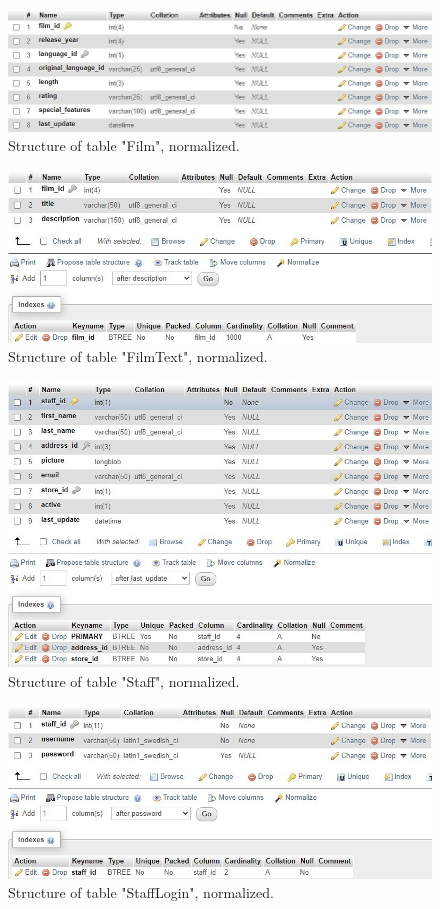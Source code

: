 \documentclass{article}
\begin{document}
		\begin{figure}[H]
			\includegraphics[width=\textwidth]{table_film_nstruct}
			\caption{Structure of table "Film", normalized.}
		\end{figure}
		\begin{figure}[H]
			\includegraphics[width=\textwidth]{table_filmtext_nstruct}
			\caption{Structure of table "Film\textunderscore Text", normalized.}
		\end{figure}
		\begin{figure}[H]
			\includegraphics[width=\textwidth]{table_staff_nstruct}
			\caption{Structure of table "Staff", normalized.}
		\end{figure}
		\begin{figure}[H]
			\includegraphics[width=\textwidth]{table_stafflogin_nstruct}
			\caption{Structure of table "Staff\textunderscore Login", normalized.}
		\end{figure}
\end{document}
